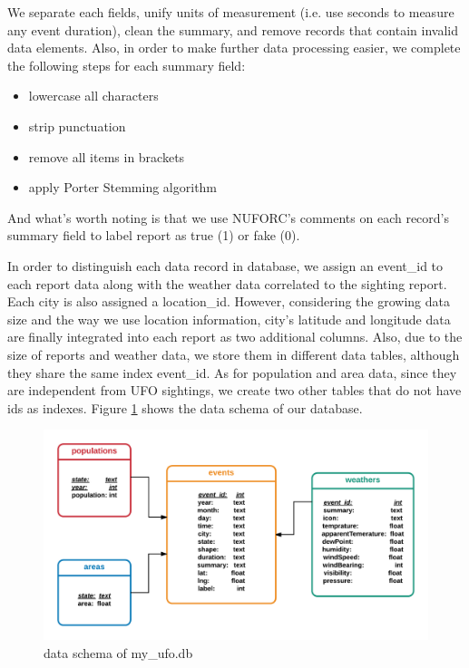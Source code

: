 We separate each fields, unify units of measurement (i.e. use seconds to measure any event duration), clean the summary, and remove records that contain invalid data elements. Also, in order to make further data processing easier, we complete the following steps for each summary field:

\begin{itemize}
    \item lowercase all characters
    \item strip punctuation
    \item remove all items in brackets
    \item apply Porter Stemming algorithm
\end{itemize}

And what's worth noting is that we use NUFORC's comments on each record's summary field to label report as true (1) or fake (0). 

In order to distinguish each data record in database, we assign an event\_id to each report data along with the weather data correlated to the sighting report. Each city is also assigned a location\_id. However, considering the growing data size and the way we use location information, city's latitude and longitude data are finally integrated into each report as two additional columns. Also, due to the size of reports and weather data, we store them in different data tables, although they share the same index event\_id. As for population and area data, since they are independent from UFO sightings, we create two other tables that do not have ids as indexes. Figure \ref{schema} shows the data schema of our database. 

\begin{figure}[H]
    \centering
    \includegraphics[width=14cm]{figure/schema.png}
    \caption{data schema of my\_ufo.db}
    \label{schema}
\end{figure}









